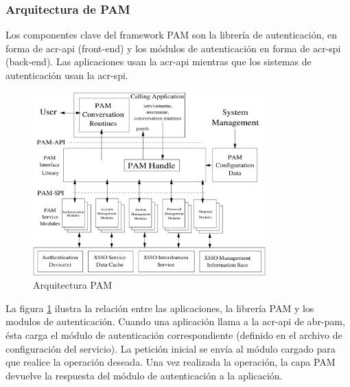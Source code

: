 \documentclass[twoside, titlepage, 12pt, a4paper]{article}
\begin{document}
\subsubsection{Arquitectura de PAM}
Los componentes clave del framework PAM son la librería de autenticación, en forma de \gls{acr-api} (\gls{front-end}) y los módulos de autenticación en forma de \gls{acr-spi} (\gls{back-end}). Las aplicaciones usan la \gls{acr-api} mientras que los sistemas de autenticación usan la \gls{acr-spi}.
\begin{figure}[H]
    \centering
    \includegraphics[width=0.8\textwidth]{Media/PAMFramework.png}
    \caption{Arquitectura PAM}
    \label{fig:arquitecturaPAM}
\end{figure}
La figura \ref{fig:arquitecturaPAM} ilustra la relación entre las aplicaciones, la librería PAM y los modulos de autenticación. Cuando una aplicación llama a la \gls{acr-api} de \gls{abr-pam}, ésta carga el módulo de autenticación correspondiente (definido en el archivo de configuración del servicio). La petición inicial se envía al módulo cargado para que realice la operación deseada. Una vez realizada la operación, la capa PAM devuelve la respuesta del módulo de autenticación a la aplicación\cite{PAM}.
\end{document}
